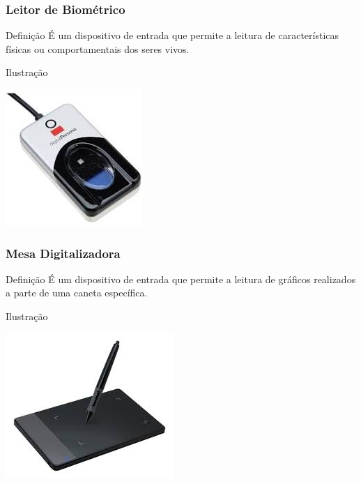 \documentclass[aspectratio=169]{beamer} %
\begin{document}
\begin{frame}
	\frametitle{Leitor de Biométrico}
	
	\begin{block}{Defini\c cão}
		É um dispositivo de entrada que permite a leitura de características físicas ou comportamentais dos seres vivos.
	\end{block}\vfill
	
	\begin{exampleblock}{Ilustra\c cão}
		\begin{center}
			\includegraphics[scale=0.5]{img/leitor_biometrico}
		\end{center}		
	\end{exampleblock}
\end{frame}

\begin{frame}
	\frametitle{Mesa Digitalizadora}
	
	\begin{block}{Defini\c cão}
		É um dispositivo de entrada que permite a leitura de gráficos realizados a parte de uma caneta específica.
	\end{block}\vfill
	
	\begin{exampleblock}{Ilustra\c cão}
		\begin{center}
			\includegraphics[scale=0.5]{img/mesa_digitalizadora}
		\end{center}		
	\end{exampleblock}
\end{frame}
\end{document}
